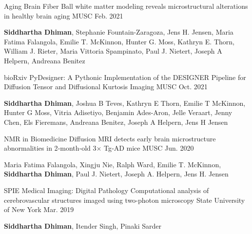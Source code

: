 \begin{cventries}

  \cventry
    {Aging Brain} %
    {Fiber Ball white matter modeling reveals microstructural alterations in healthy brain aging} %
    {MUSC} %
    {Feb. 2021} %
    {
      \begin{cvitems} %
        \item {\textbf{Siddhartha Dhiman}, Stephanie Fountain-Zaragoza, Jens H. Jensen, Maria Fatima Falangola, Emilie T. McKinnon, Hunter G. Moss, Kathryn E. Thorn, William J. Rieter, Maria Vittoria Spampinato, Paul J. Nietert, Joseph A Helpern, Andreana Benitez}
      \end{cvitems}
    }


  \cventry
    {bioRxiv} %
    {PyDesigner: A Pythonic Implementation of the DESIGNER Pipeline for Diffusion Tensor and Diffusional Kurtosis Imaging} %
    {MUSC} %
    {Oct. 2021} %
    {
      \begin{cvitems} %
        \item {\textbf{Siddhartha Dhiman}, Joshua B Teves, Kathryn E Thorn, Emilie T McKinnon, Hunter G Moss, Vitria Adisetiyo, Benjamin Ades-Aron, Jelle Veraart, Jenny Chen, Els Fieremans, Andreana Benitez, Joseph A Helpern, Jens H Jensen}
      \end{cvitems}
    }

  \cventry
    {NMR in Biomedicine} %
    {Diffusion MRI detects early brain microstructure abnormalities in 2‐month‐old 3× Tg‐AD mice} %
    {MUSC} %
    {Jun. 2020} %
    {
      \begin{cvitems} %
        \item {Maria Fatima Falangola, Xingju Nie, Ralph Ward, Emilie T. McKinnon, \textbf{Siddhartha Dhiman}, Paul J. Nietert, Joseph A. Helpern, Jens H. Jensen}
      \end{cvitems}
    }

  \cventry
    {SPIE Medical Imaging: Digital Pathology} %
    {Computational analysis of cerebrovascular structures imaged using two-photon microscopy} %
    {State University of New York} %
    {Mar. 2019} %
    {
      \begin{cvitems} %
        \item {\textbf{Siddhartha Dhiman}, Itender Singh, Pinaki Sarder}
      \end{cvitems}
    }


\end{cventries}
